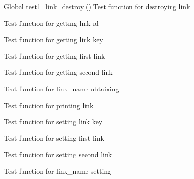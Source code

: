 \begin{DoxyRefList}
\hypertarget{test__test000041}{}%
Global \hyperlink{link__test_8c_ad4ca02e93472a080362a005ea4840218}{test1\+\_\+link\+\_\+destroy} ()]Test function for destroying link  
\item[\label{test__test000039}%
\hypertarget{test__test000039}{}%
Global \hyperlink{link__test_8c_a19c70f79fd51d123173f7aaf6ae50bf8}{test1\+\_\+link\+\_\+get\+\_\+id} ()]Test function for getting link id  
\item[\label{test__test000047}%
\hypertarget{test__test000047}{}%
Global \hyperlink{link__test_8c_a7dbdc2cfa491e66bba605d96304cf9a9}{test1\+\_\+link\+\_\+get\+\_\+key} ()]Test function for getting link key  
\item[\label{test__test000035}%
\hypertarget{test__test000035}{}%
Global \hyperlink{link__test_8c_a4e076db559af261fc8e6994cf9cde12c}{test1\+\_\+link\+\_\+get\+\_\+link1} ()]Test function for getting first link  
\item[\label{test__test000037}%
\hypertarget{test__test000037}{}%
Global \hyperlink{link__test_8c_a7a8a4b1f4730d248d2c7d648ee4da602}{test1\+\_\+link\+\_\+get\+\_\+link2} ()]Test function for getting second link  
\item[\label{test__test000033}%
\hypertarget{test__test000033}{}%
Global \hyperlink{link__test_8c_a044128db00a5cc385d7157dea8bdf3c3}{test1\+\_\+link\+\_\+get\+\_\+name} ()]Test function for link\+\_\+name obtaining  
\item[\label{test__test000043}%
\hypertarget{test__test000043}{}%
Global \hyperlink{link__test_8c_af99aa73f22b107610780db4877e34448}{test1\+\_\+link\+\_\+print} ()]Test function for printing link  
\item[\label{test__test000044}%
\hypertarget{test__test000044}{}%
Global \hyperlink{link__test_8c_a0e42040390aae2aae9f0adee136fe359}{test1\+\_\+link\+\_\+set\+\_\+key} ()]Test function for setting link key  
\item[\label{test__test000027}%
\hypertarget{test__test000027}{}%
Global \hyperlink{link__test_8c_a994aea17881a284366d11ac85d8c60a9}{test1\+\_\+link\+\_\+set\+\_\+link1} ()]Test function for setting first link  
\item[\label{test__test000029}%
\hypertarget{test__test000029}{}%
Global \hyperlink{link__test_8c_a4e44e515a644abf600efd18aaca7963a}{test1\+\_\+link\+\_\+set\+\_\+link2} ()]Test function for setting second link  
\item[\label{test__test000024}%
\hypertarget{test__test000024}{}%
Global \hyperlink{link__test_8c_ae0e478a0540bed26befc071591e3ff6c}{test1\+\_\+link\+\_\+set\+\_\+name} ()]Test function for link\+\_\+name setting  

\end{DoxyRefList}
